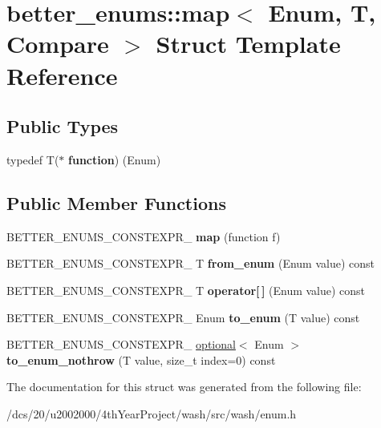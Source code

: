 \hypertarget{structbetter__enums_1_1map}{}\section{better\+\_\+enums\+:\+:map$<$ Enum, T, Compare $>$ Struct Template Reference}
\label{structbetter__enums_1_1map}
\subsection*{Public Types}
\begin{DoxyCompactItemize}
\item 
\mbox{\label{structbetter__enums_1_1map_a225f81223779091e6761c74c766d7db1}} 
typedef T($\ast$ {\bfseries function}) (Enum)
\end{DoxyCompactItemize}
\subsection*{Public Member Functions}
\begin{DoxyCompactItemize}
\item 
\mbox{\label{structbetter__enums_1_1map_a5010e83ee9aa33e273832f344a7ffe10}} 
B\+E\+T\+T\+E\+R\+\_\+\+E\+N\+U\+M\+S\+\_\+\+C\+O\+N\+S\+T\+E\+X\+P\+R\+\_\+ {\bfseries map} (function f)
\item 
\mbox{\label{structbetter__enums_1_1map_afd371738df1b327d042a1bfe6938d92d}} 
B\+E\+T\+T\+E\+R\+\_\+\+E\+N\+U\+M\+S\+\_\+\+C\+O\+N\+S\+T\+E\+X\+P\+R\+\_\+ T {\bfseries from\+\_\+enum} (Enum value) const
\item 
\mbox{\label{structbetter__enums_1_1map_a0369a139acd93f5991103a2d5f3eacf9}} 
B\+E\+T\+T\+E\+R\+\_\+\+E\+N\+U\+M\+S\+\_\+\+C\+O\+N\+S\+T\+E\+X\+P\+R\+\_\+ T {\bfseries operator\mbox{[}$\,$\mbox{]}} (Enum value) const
\item 
\mbox{\label{structbetter__enums_1_1map_a18ad2328a67af6d866e2fbc16b890ece}} 
B\+E\+T\+T\+E\+R\+\_\+\+E\+N\+U\+M\+S\+\_\+\+C\+O\+N\+S\+T\+E\+X\+P\+R\+\_\+ Enum {\bfseries to\+\_\+enum} (T value) const
\item 
\mbox{\label{structbetter__enums_1_1map_a4191ed97b5cbb98022e5dd8b6f6d5b45}} 
B\+E\+T\+T\+E\+R\+\_\+\+E\+N\+U\+M\+S\+\_\+\+C\+O\+N\+S\+T\+E\+X\+P\+R\+\_\+ \mbox{\hyperlink{structbetter__enums_1_1optional}{optional}}$<$ Enum $>$ {\bfseries to\+\_\+enum\+\_\+nothrow} (T value, size\+\_\+t index=0) const
\end{DoxyCompactItemize}


The documentation for this struct was generated from the following file\+:\begin{DoxyCompactItemize}
\item 
/dcs/20/u2002000/4th\+Year\+Project/wash/src/wash/enum.\+h\end{DoxyCompactItemize}
